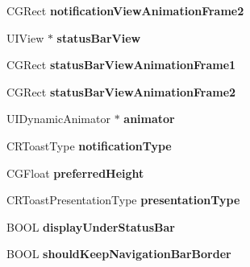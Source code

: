 \begin{DoxyCompactItemize}
\item 
\hypertarget{interface_c_r_toast_a4a0a1a56047bc7a7704b1c65f1bdeca2}{}C\+G\+Rect {\bfseries notification\+View\+Animation\+Frame2}\label{interface_c_r_toast_a4a0a1a56047bc7a7704b1c65f1bdeca2}

\item 
\hypertarget{interface_c_r_toast_a3a69995c7e18dfb2b85a26875a6122ae}{}U\+I\+View $\ast$ {\bfseries status\+Bar\+View}\label{interface_c_r_toast_a3a69995c7e18dfb2b85a26875a6122ae}

\item 
\hypertarget{interface_c_r_toast_a4cf454447cf30901e43630a2724a06fe}{}C\+G\+Rect {\bfseries status\+Bar\+View\+Animation\+Frame1}\label{interface_c_r_toast_a4cf454447cf30901e43630a2724a06fe}

\item 
\hypertarget{interface_c_r_toast_af96a3445c8e082d56f311fbf17990c9d}{}C\+G\+Rect {\bfseries status\+Bar\+View\+Animation\+Frame2}\label{interface_c_r_toast_af96a3445c8e082d56f311fbf17990c9d}

\item 
\hypertarget{interface_c_r_toast_ae378cd63da01f9e2fa19006f7f3cf730}{}U\+I\+Dynamic\+Animator $\ast$ {\bfseries animator}\label{interface_c_r_toast_ae378cd63da01f9e2fa19006f7f3cf730}

\item 
\hypertarget{interface_c_r_toast_a8f37e8f542f72e4e97f7914ee308bd18}{}C\+R\+Toast\+Type {\bfseries notification\+Type}\label{interface_c_r_toast_a8f37e8f542f72e4e97f7914ee308bd18}

\item 
\hypertarget{interface_c_r_toast_a1e0332647ddf4799abc0f71ef8729137}{}C\+G\+Float {\bfseries preferred\+Height}\label{interface_c_r_toast_a1e0332647ddf4799abc0f71ef8729137}

\item 
\hypertarget{interface_c_r_toast_a2c459a889e934b18155f9619f1504dc7}{}C\+R\+Toast\+Presentation\+Type {\bfseries presentation\+Type}\label{interface_c_r_toast_a2c459a889e934b18155f9619f1504dc7}

\item 
\hypertarget{interface_c_r_toast_af7c89dc9ce7c17e78f2c8790468e02fe}{}B\+O\+O\+L {\bfseries display\+Under\+Status\+Bar}\label{interface_c_r_toast_af7c89dc9ce7c17e78f2c8790468e02fe}

\item 
\hypertarget{interface_c_r_toast_a64ab7c6c4e09cf50e5b8b04e45d658af}{}B\+O\+O\+L {\bfseries should\+Keep\+Navigation\+Bar\+Border}\label{interface_c_r_toast_a64ab7c6c4e09cf50e5b8b04e45d658af}


\end{DoxyCompactItemize}
